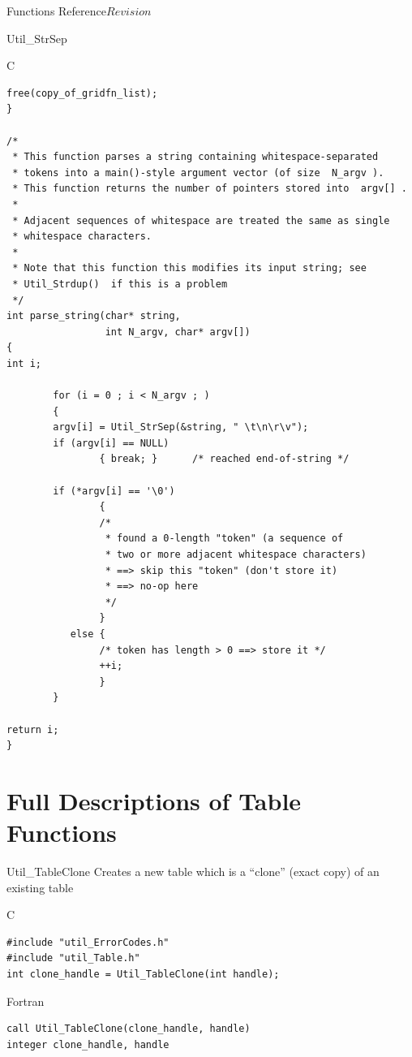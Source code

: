 \begin{cactuspart}{ Functions Reference}{}{$Revision$}
\begin{FunctionDescription}{Util\_StrSep}
\begin{ExampleSection}
\begin{Example}{C}
\begin{verbatim}
free(copy_of_gridfn_list);
}

/*
 * This function parses a string containing whitespace-separated
 * tokens into a main()-style argument vector (of size  N_argv ).
 * This function returns the number of pointers stored into  argv[] .
 *
 * Adjacent sequences of whitespace are treated the same as single
 * whitespace characters.
 *
 * Note that this function this modifies its input string; see
 * Util_Strdup()  if this is a problem
 */
int parse_string(char* string,
                 int N_argv, char* argv[])
{
int i;

        for (i = 0 ; i < N_argv ; )
        {
        argv[i] = Util_StrSep(&string, " \t\n\r\v");
        if (argv[i] == NULL)
                { break; }      /* reached end-of-string */

        if (*argv[i] == '\0')
                {
                /*
                 * found a 0-length "token" (a sequence of
                 * two or more adjacent whitespace characters)
                 * ==> skip this "token" (don't store it)
                 * ==> no-op here
                 */
                }
           else {
                /* token has length > 0 ==> store it */
                ++i;
                }
        }

return i;
}
\end{verbatim}
\end{Example}
\end{ExampleSection}
\end{FunctionDescription}


\chapter{Full Descriptions of Table Functions}


\begin{FunctionDescription}{Util\_TableClone}
\label{Util-TableClone}
Creates a new table which is a ``clone'' (exact copy) of an existing
table

\begin{SynopsisSection}
\begin{Synopsis}{C}
\begin{verbatim}
#include "util_ErrorCodes.h"
#include "util_Table.h"
int clone_handle = Util_TableClone(int handle);
\end{verbatim}
\end{Synopsis}
\begin{Synopsis}{Fortran}
\begin{verbatim}
call Util_TableClone(clone_handle, handle)
integer clone_handle, handle
\end{verbatim}
\end{Synopsis}
\end{SynopsisSection}


\end{FunctionDescription}
\end{cactuspart}
